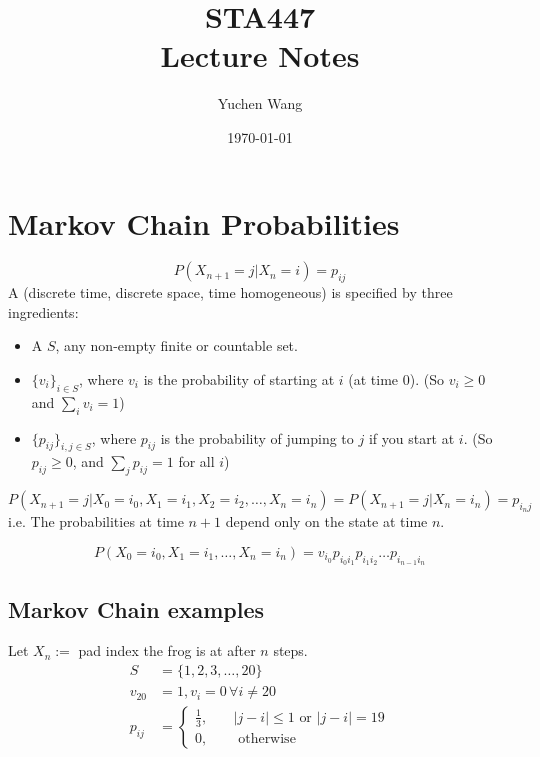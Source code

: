 \documentclass[11pt]{article}
\title{STA447\\ Lecture Notes}
\author{Yuchen Wang}
\date{\today}
\begin{document}
    \maketitle
    \tableofcontents
    \newpage
    
    \section{Markov Chain Probabilities}
    \notation
    $$P(X_{n+1} = j | X_n = i) = p_{ij}$$
     A (discrete time, discrete space, time homogeneous)  is specified by three ingredients:
    \begin{itemize}
    	\item A  $S$, any non-empty finite or countable set.
    	\item {} $\{v_i\}_{i \in S}$, where $v_i$ is the probability of starting at $i$ (at time 0). (So $v_i \geq 0$ and $\sum_i v_i = 1$)
    	\item {} $\{p_{ij}\}_{i, j\in S}$, where $p_{ij}$ is the probability of jumping to $j$ if you start at $i$. (So $p_{ij} \geq 0$, and $\sum_j p_{ij} = 1$ for all $i$)
    \end{itemize}
    
    $$P(X_{n+1} = j | X_0 = i_0, X_1 = i_1, X_2 = i_2, \hdots, X_n = i_n) = P(X_{n+1} = j | X_n = i_n) = p_{i_nj}$$
    i.e. The probabilities at time $n+1$ depend only on the state at time $n$.
    
    \remark
    $$P(X_0 = i_0, X_1 = i_1, \hdots, X_n = i_n) = v_{i_0}p_{i_0i_1}p_{i_1i_2} \hdots p_{i_{n-1}i_n}$$
    
    \subsection{Markov Chain examples}
    Let $X_n :=$ pad index the frog is at after $n$ steps.
    \begin{align*}
    	S &= \{1, 2, 3, \hdots, 20\}\\
    	v_{20} &= 1, v_i = 0 \, \forall i \neq 20 \\
    	p_{ij} &= \begin{cases}
    		\frac{1}{3}, \quad &|j - i| \leq 1 \text{ or } |j - i| = 19\\
    	0, \quad &\text{ otherwise }
    	\end{cases}
    \end{align*}
    
\end{document}
